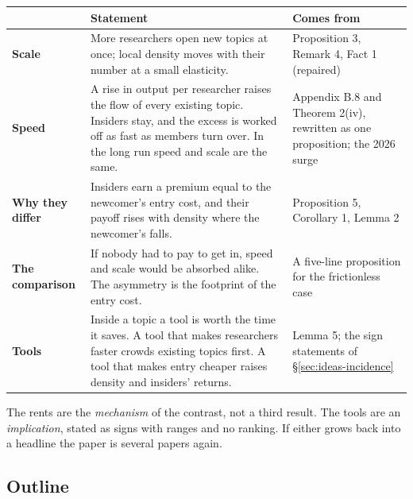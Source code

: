 \begin{center}\small
\begin{tabularx}{\textwidth}{@{}P{0.95in}LP{1.35in}@{}}
\toprule
 & Statement & Comes from \\
\midrule
\textbf{Scale} & More researchers open new topics at once; local density moves with their number at a small elasticity. & Proposition 3, Remark 4, Fact 1 (repaired) \\
\textbf{Speed} & A rise in output per researcher raises the flow of every existing topic. Insiders stay, and the excess is worked off as fast as members turn over. In the long run speed and scale are the same. & Appendix B.8 and Theorem 2(iv), rewritten as one proposition; the 2026 surge \\
\textbf{Why they differ} & Insiders earn a premium equal to the newcomer's entry cost, and their payoff rises with density where the newcomer's falls. & Proposition 5, Corollary 1, Lemma 2 \\
\textbf{The comparison} & If nobody had to pay to get in, speed and scale would be absorbed alike. The asymmetry is the footprint of the entry cost. & A five-line proposition for the frictionless case \\
\textbf{Tools} & Inside a topic a tool is worth the time it saves. A tool that makes researchers faster crowds existing topics first. A tool that makes entry cheaper raises density and insiders' returns. & Lemma 5; the sign statements of \S\ref{sec:ideas-incidence} \\
\bottomrule
\end{tabularx}
\end{center}

The rents are the \emph{mechanism} of the contrast, not a third result. The tools are an \emph{implication}, stated as signs with ranges and no ranking. If either grows back into a headline the paper is several papers again.

\subsection{Outline}

